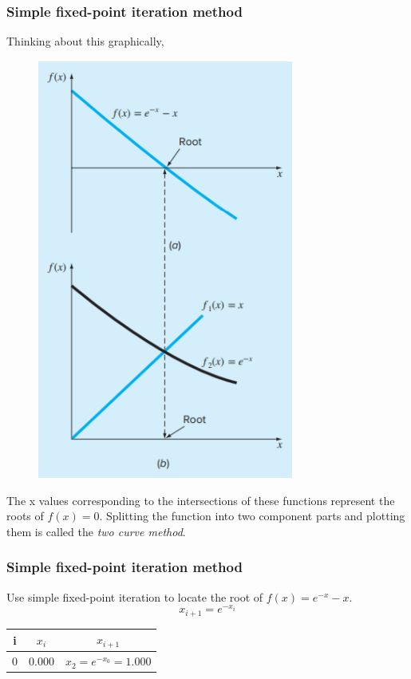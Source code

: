 \documentclass{if-beamer}
\begin{document}
\begin{frame}
\frametitle{Simple fixed-point iteration method}
Thinking about this graphically, \\\vspace{5pt}
\begin{minipage}{0.5\textwidth}
	\begin{figure}
		\includegraphics[width = 0.75\textwidth]{figures/graphic}
	\end{figure}
\end{minipage}
\begin{minipage}{0.5\textwidth}
	The x values corresponding to the intersections of these functions represent the roots of $f(x)=0$. Splitting the function into two component parts and plotting them is called the \textit{two curve method}.
\end{minipage}
 
\end{frame}

\begin{frame}[t]
\frametitle{Simple fixed-point iteration method}
Use simple fixed-point iteration to locate the root of $f(x) = e^{-x}-x$.
$$x_{i+1} = e^{-x_i}$$
\begin{table}
	\begin{tabular}{c | c | c}
		i & $x_i$ & $x_{i+1}$ \\
		\hline
		0 & 0.000 & $x_2 = e^{-x_0} = 1.000$\\ 
	\end{tabular}
\end{table}
\end{frame}
\end{document}
